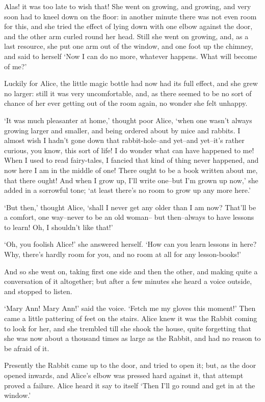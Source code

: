 \documentclass[statementpaper,twoside,openany]{memoir}
\begin{document}
Alas! it was too late to wish that! She went on growing, and growing, and very soon had to kneel down on the floor: in another minute there was not even room for this, and she tried the effect of lying down with one elbow against the door, and the other arm curled round her head. Still she went on growing, and, as a last resource, she put one arm out of the window, and one foot up the chimney, and said to herself `Now I can do no more, whatever happens. What will become of me?'

Luckily for Alice, the little magic bottle had now had its full effect, and she grew no larger: still it was very uncomfortable, and, as there seemed to be no sort of chance of her ever getting out of the room again, no wonder she felt unhappy.

`It was much pleasanter at home,' thought poor Alice, `when one wasn't always growing larger and smaller, and being ordered about by mice and rabbits. I almost wish I hadn't gone down that rabbit-hole--and yet--and yet--it's rather curious, you know, this sort of life! I do wonder what can have happened to me! When I used to read fairy-tales, I fancied that kind of thing never happened, and now here I am in the middle of one! There ought to be a book written about me, that there ought! And when I grow up, I'll write one--but I'm grown up now,' she added in a sorrowful tone; `at least there's no room to grow up any more here.'

`But then,' thought Alice, `shall I never get any older than I am now? That'll be a comfort, one way--never to be an old woman-- but then--always to have lessons to learn! Oh, I shouldn't like that!'

`Oh, you foolish Alice!' she answered herself. `How can you learn lessons in here? Why, there's hardly room for you, and no room at all for any lesson-books!'

And so she went on, taking first one side and then the other, and making quite a conversation of it altogether; but after a few minutes she heard a voice outside, and stopped to listen.

`Mary Ann! Mary Ann!' said the voice. `Fetch me my gloves this moment!' Then came a little pattering of feet on the stairs. Alice knew it was the Rabbit coming to look for her, and she trembled till she shook the house, quite forgetting that she was now about a thousand times as large as the Rabbit, and had no reason to be afraid of it.

Presently the Rabbit came up to the door, and tried to open it; but, as the door opened inwards, and Alice's elbow was pressed hard against it, that attempt proved a failure. Alice heard it say to itself `Then I'll go round and get in at the window.'
\end{document}
